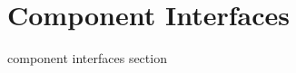 \documentclass[../../../../dd.tex]{subfiles}
\begin{document}
	\section{Component Interfaces}

	component interfaces section
	
\end{document}
